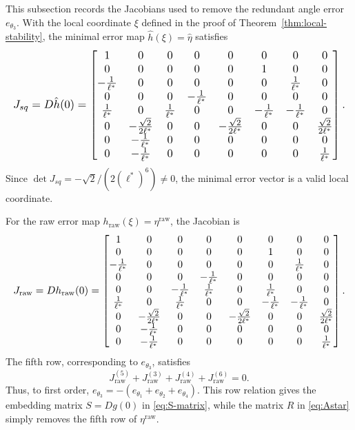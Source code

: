 \documentclass[letterpaper,journal]{IEEEtran}
\theoremstyle{plain}
\theoremstyle{definition}
\theoremstyle{remark}
\begin{document}
This subsection records the Jacobians used to remove the redundant angle error \(e_{\theta_3}\). With the local coordinate \(\xi\) defined in the proof of Theorem~\ref{thm:local-stability}, the minimal error map \(\hat h(\xi)=\hat\eta\) satisfies
\begin{equation}
\resizebox{\columnwidth}{!}{$
J_{sq}=D\hat h(0)=
\begin{bmatrix}
1&0&0&0&0&0&0&0\\
0&0&0&0&0&1&0&0\\
-\frac{1}{\ell^*}&0&0&0&0&0&\frac{1}{\ell^*}&0\\
0&0&0&-\frac{1}{\ell^*}&0&0&0&0\\
\frac{1}{\ell^*}&0&\frac{1}{\ell^*}&0&0&-\frac{1}{\ell^*}&-\frac{1}{\ell^*}&0\\
0&-\frac{\sqrt2}{2\ell^*}&0&0&-\frac{\sqrt2}{2\ell^*}&0&0&\frac{\sqrt2}{2\ell^*}\\
0&-\frac{1}{\ell^*}&0&0&0&0&0&0\\
0&-\frac{1}{\ell^*}&0&0&0&0&0&\frac{1}{\ell^*}
\end{bmatrix}.
$}
\label{eq:Jsq}
\end{equation}
Since \(\det J_{sq}=-\sqrt2/(2(\ell^*)^6)\neq0\), the minimal error vector is a valid local coordinate.

For the raw error map \(h_{\mathrm{raw}}(\xi)=\eta^{\mathrm{raw}}\), the Jacobian is
\begin{equation}
\resizebox{\columnwidth}{!}{$
J_{\mathrm{raw}}=Dh_{\mathrm{raw}}(0)=
\begin{bmatrix}
1&0&0&0&0&0&0&0\\
0&0&0&0&0&1&0&0\\
-\frac{1}{\ell^*}&0&0&0&0&0&\frac{1}{\ell^*}&0\\
0&0&0&-\frac{1}{\ell^*}&0&0&0&0\\
0&0&-\frac{1}{\ell^*}&\frac{1}{\ell^*}&0&\frac{1}{\ell^*}&0&0\\
\frac{1}{\ell^*}&0&\frac{1}{\ell^*}&0&0&-\frac{1}{\ell^*}&-\frac{1}{\ell^*}&0\\
0&-\frac{\sqrt2}{2\ell^*}&0&0&-\frac{\sqrt2}{2\ell^*}&0&0&\frac{\sqrt2}{2\ell^*}\\
0&-\frac{1}{\ell^*}&0&0&0&0&0&0\\
0&-\frac{1}{\ell^*}&0&0&0&0&0&\frac{1}{\ell^*}
\end{bmatrix}.
$}
\label{eq:Jraw}
\end{equation}
The fifth row, corresponding to \(e_{\theta_3}\), satisfies
\begin{equation}
J_{\mathrm{raw}}^{(5)}+J_{\mathrm{raw}}^{(3)}
+J_{\mathrm{raw}}^{(4)}+J_{\mathrm{raw}}^{(6)}=0.
\label{eq:Jraw-row-relation}
\end{equation}
Thus, to first order, \(e_{\theta_3}=-(e_{\theta_1}+e_{\theta_2}+e_{\theta_4})\). This row relation gives the embedding matrix \(S=Dg(0)\) in \eqref{eq:S-matrix}, while the matrix \(R\) in \eqref{eq:Astar} simply removes the fifth row of \(\eta^{\mathrm{raw}}\).
\end{document}
